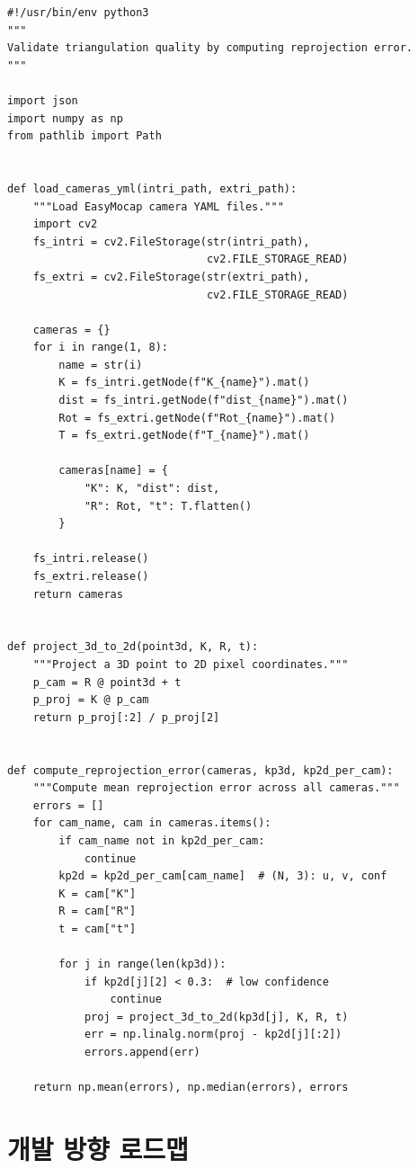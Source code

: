 \documentclass[11pt, a4paper]{report}
\begin{document}
\begin{lstlisting}[caption={validate\_reprojection.py --- 삼각측량 결과 검증}, label=lst:validate]
#!/usr/bin/env python3
"""
Validate triangulation quality by computing reprojection error.
"""

import json
import numpy as np
from pathlib import Path


def load_cameras_yml(intri_path, extri_path):
    """Load EasyMocap camera YAML files."""
    import cv2
    fs_intri = cv2.FileStorage(str(intri_path),
                               cv2.FILE_STORAGE_READ)
    fs_extri = cv2.FileStorage(str(extri_path),
                               cv2.FILE_STORAGE_READ)

    cameras = {}
    for i in range(1, 8):
        name = str(i)
        K = fs_intri.getNode(f"K_{name}").mat()
        dist = fs_intri.getNode(f"dist_{name}").mat()
        Rot = fs_extri.getNode(f"Rot_{name}").mat()
        T = fs_extri.getNode(f"T_{name}").mat()

        cameras[name] = {
            "K": K, "dist": dist,
            "R": Rot, "t": T.flatten()
        }

    fs_intri.release()
    fs_extri.release()
    return cameras


def project_3d_to_2d(point3d, K, R, t):
    """Project a 3D point to 2D pixel coordinates."""
    p_cam = R @ point3d + t
    p_proj = K @ p_cam
    return p_proj[:2] / p_proj[2]


def compute_reprojection_error(cameras, kp3d, kp2d_per_cam):
    """Compute mean reprojection error across all cameras."""
    errors = []
    for cam_name, cam in cameras.items():
        if cam_name not in kp2d_per_cam:
            continue
        kp2d = kp2d_per_cam[cam_name]  # (N, 3): u, v, conf
        K = cam["K"]
        R = cam["R"]
        t = cam["t"]

        for j in range(len(kp3d)):
            if kp2d[j][2] < 0.3:  # low confidence
                continue
            proj = project_3d_to_2d(kp3d[j], K, R, t)
            err = np.linalg.norm(proj - kp2d[j][:2])
            errors.append(err)

    return np.mean(errors), np.median(errors), errors
\end{lstlisting}


\chapter{개발 방향 로드맵}
\end{document}
